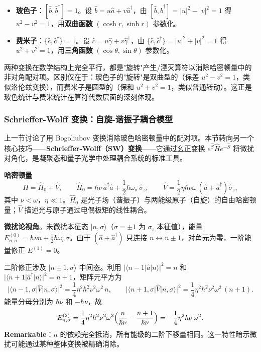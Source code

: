 \begin{insightbox}
\begin{itemize}[nosep]
    \item \textbf{玻色子}：$[\hat{b},\hat{b}^\dagger]=1$。设 $\hat{b}=u\hat{a}+v\hat{a}^\dagger$，由 $[\hat{b},\hat{b}^\dagger]=|u|^2-|v|^2=1$ 得 $u^2-v^2=1$，用\textbf{双曲函数} $(\cosh r, \sinh r)$ 参数化。
    \item \textbf{费米子}：$\{\hat{c},\hat{c}^\dagger\}=1$。设 $\hat{c}=u\hat{\gamma}+v\hat{\gamma}^\dagger$，由 $\{\hat{c},\hat{c}^\dagger\}=|u|^2+|v|^2=1$ 得 $u^2+v^2=1$，用\textbf{三角函数} $(\cos\theta, \sin\theta)$ 参数化。
\end{itemize}
两种变换在数学结构上完全平行，都是"旋转"产生/湮灭算符以消除哈密顿量中的非对角配对项。区别仅在于：玻色子的"旋转"是双曲型的（保差 $u^2-v^2=1$，类似洛伦兹变换），而费米子是圆型的（保和 $u^2+v^2=1$，类似普通转动）。这正是玻色统计与费米统计在算符代数层面的深刻体现。
\end{insightbox}


\subsubsection{Schrieffer-Wolff 变换：自旋-谐振子耦合模型}

上一节讨论了用 Bogoliubov 变换消除玻色哈密顿量中的配对项。本节转向另一个核心技巧——\textbf{Schrieffer-Wolff（SW）变换}——它通过幺正变换 $e^{\hat{S}}\hat{H}e^{-\hat{S}}$ 将微扰对角化，是凝聚态和量子光学中处理耦合系统的标准工具。

\begin{modelbox}[模型：自旋-玻色耦合]
\textbf{哈密顿量}
\[
\hat{H} = \hat{H}_0 + \hat{V},
\qquad
\hat{H}_0 = \hbar\nu\,\hat{a}^\dagger\hat{a} + \frac12\hbar\omega_\sigma\,\hat{\sigma}_z,
\qquad
\hat{V} = \frac12\eta\hbar\nu\omega\,(\hat{a}+\hat{a}^\dagger)\hat{\sigma}_z,
\]
其中 $\nu<\omega$，$\eta\ll 1$。$\hat{H}_0$ 是光子场（谐振子）与两能级原子（自旋）的自由哈密顿量；$\hat{V}$ 描述光与原子通过电偶极矩的线性耦合。
\end{modelbox}

\textbf{微扰论视角}。未微扰本征态 $|n,\sigma\rangle$（$\sigma=\pm 1$ 为 $\sigma_z$ 本征值），能量 $E_{n,\sigma}^{(0)}=\hbar\nu n + \frac12\hbar\omega_\sigma\sigma$。由于 $(\hat{a}+\hat{a}^\dagger)$ 只连接 $n\leftrightarrow n\pm 1$，对角元为零，一阶能量修正 $E^{(1)}=0$。

二阶修正涉及 $|n\pm 1,\sigma\rangle$ 中间态。利用 $|\langle n-1|\hat{a}|n\rangle|^2=n$ 和 $|\langle n+1|\hat{a}^\dagger|n\rangle|^2=n+1$，矩阵元平方为
\[
|\langle n-1,\sigma|\hat{V}|n,\sigma\rangle|^2 = \frac14\eta^2\hbar^2\nu^2\omega^2\,n,
\qquad
|\langle n+1,\sigma|\hat{V}|n,\sigma\rangle|^2 = \frac14\eta^2\hbar^2\nu^2\omega^2\,(n+1).
\]
能量分母分别为 $\hbar\nu$ 和 $-\hbar\nu$，故
\begin{equation}
\label{eq:sw-2nd-pt}
E_{n,\sigma}^{(2)} = \frac14\eta^2\hbar^2\nu^2\omega^2\Bigl(\frac{n}{\hbar\nu} - \frac{n+1}{\hbar\nu}\Bigr) = -\frac14\eta^2\hbar\nu\,\omega^2.
\end{equation}
\textbf{Remarkable}：$n$ 的依赖完全抵消，所有能级的二阶下移量相同。这一特性暗示微扰可能通过某种整体变换被精确消除。

